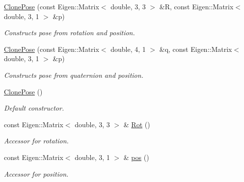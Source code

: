 \begin{DoxyCompactItemize}
\item 
\mbox{\label{structov__core_1_1FeatureInitializer_1_1ClonePose_a03004e652d7e39db06ba1efee87baf35}} 
\hyperlink{structov__core_1_1FeatureInitializer_1_1ClonePose_a03004e652d7e39db06ba1efee87baf35}{Clone\+Pose} (const Eigen\+::\+Matrix$<$ double, 3, 3 $>$ \&R, const Eigen\+::\+Matrix$<$ double, 3, 1 $>$ \&p)
\begin{DoxyCompactList}\small\item\em Constructs pose from rotation and position. \end{DoxyCompactList}\item 
\mbox{\label{structov__core_1_1FeatureInitializer_1_1ClonePose_a8a71caa7b8fe89be792cf7392035303b}} 
\hyperlink{structov__core_1_1FeatureInitializer_1_1ClonePose_a8a71caa7b8fe89be792cf7392035303b}{Clone\+Pose} (const Eigen\+::\+Matrix$<$ double, 4, 1 $>$ \&q, const Eigen\+::\+Matrix$<$ double, 3, 1 $>$ \&p)
\begin{DoxyCompactList}\small\item\em Constructs pose from quaternion and position. \end{DoxyCompactList}\item 
\mbox{\label{structov__core_1_1FeatureInitializer_1_1ClonePose_a547f0ca911c273202c71ae5ef0dd21b8}} 
\hyperlink{structov__core_1_1FeatureInitializer_1_1ClonePose_a547f0ca911c273202c71ae5ef0dd21b8}{Clone\+Pose} ()
\begin{DoxyCompactList}\small\item\em Default constructor. \end{DoxyCompactList}\item 
\mbox{\label{structov__core_1_1FeatureInitializer_1_1ClonePose_a0ceb30018eb94165b9ae122f9a644b3c}} 
const Eigen\+::\+Matrix$<$ double, 3, 3 $>$ \& \hyperlink{structov__core_1_1FeatureInitializer_1_1ClonePose_a0ceb30018eb94165b9ae122f9a644b3c}{Rot} ()
\begin{DoxyCompactList}\small\item\em Accessor for rotation. \end{DoxyCompactList}\item 
\mbox{\label{structov__core_1_1FeatureInitializer_1_1ClonePose_aaa93798264c4123ba8cbdd0daa1c8f95}} 
const Eigen\+::\+Matrix$<$ double, 3, 1 $>$ \& \hyperlink{structov__core_1_1FeatureInitializer_1_1ClonePose_aaa93798264c4123ba8cbdd0daa1c8f95}{pos} ()
\begin{DoxyCompactList}\small\item\em Accessor for position. \end{DoxyCompactList}\end{DoxyCompactItemize}
